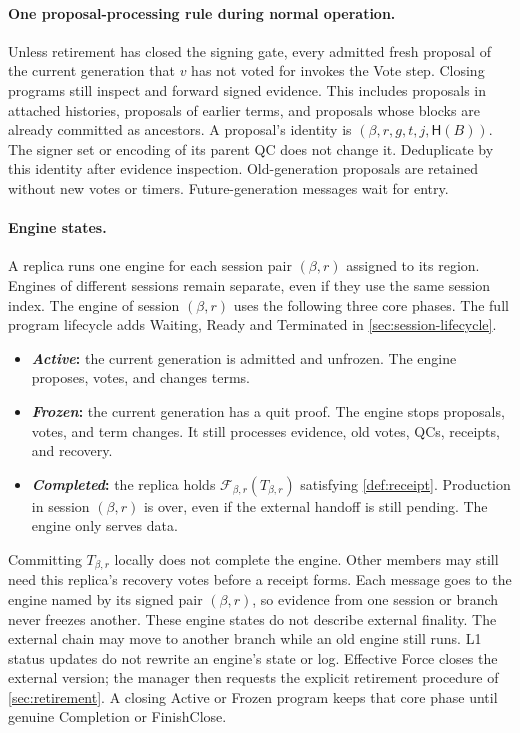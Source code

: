 \documentclass[11pt,a4paper]{article}
\newcommand{\FC}{\mathcal F}
\newcommand{\Hash}{\mathsf H}
\newcommand{\defterm}[1]{\textcolor{rrBlue}{\textit{#1}}}
\begin{document}
\paragraph{One proposal-processing rule during normal operation.}
Unless retirement has closed the signing gate, every admitted fresh
proposal of the current generation that $v$ has not voted for invokes the
Vote step. Closing programs still inspect and forward signed evidence. This includes proposals in attached
histories, proposals of earlier terms, and proposals whose blocks are
already committed as ancestors. A proposal's identity is
$(\beta,r,g,t,j,\Hash(B))$. The signer set or encoding of its parent QC does
not change it. Deduplicate by this identity after evidence inspection.
Old-generation proposals are retained without new votes or timers.
Future-generation messages wait for entry.

\paragraph{Engine states.}
A replica runs one engine for each session pair $(\beta,r)$ assigned to its region.
Engines of different sessions remain separate, even if they use the
same session index. The engine of
session $(\beta,r)$ uses the following three core phases. The full
program lifecycle adds Waiting, Ready and Terminated in
\cref{sec:session-lifecycle}.
\begin{itemize}
\item \textbf{\defterm{Active}:} the current generation is admitted and unfrozen.
The engine proposes, votes, and changes terms.
\item \textbf{\defterm{Frozen}:} the current generation has a quit proof. The
engine stops proposals, votes, and term changes. It still processes
evidence, old votes, QCs, receipts, and recovery.
\item \textbf{\defterm{Completed}:} the replica holds $\FC_{\beta,r}(T_{\beta,r})$ satisfying
\cref{def:receipt}.
Production in session $(\beta,r)$ is over, even if the external handoff is still
pending. The engine only serves data.
\end{itemize}
Committing $T_{\beta,r}$ locally does not complete the engine. Other members may
still need this replica's recovery votes before a receipt forms. Each
message goes to the engine named by its signed pair $(\beta,r)$, so
evidence from one session or branch never freezes another. These engine
states do not describe external finality. The external chain may move
to another branch while an old engine still runs. L1 status
updates do not rewrite an engine's state or log. Effective Force closes
the external version; the manager then requests the explicit retirement
procedure of \cref{sec:retirement}. A closing Active or Frozen program
keeps that core phase until genuine Completion or FinishClose.
\end{document}
